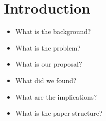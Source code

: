 \section{Introduction}

\begin{itemize}
    \item What is the background?
    \item What is the problem?
    \item What is our proposal?
    \item What did we found?
    \item What are the implications?
    \item What is the paper structure?
\end{itemize}
